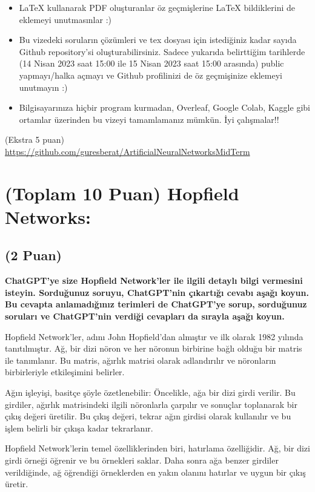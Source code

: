 \documentclass[11pt]{article}
\begin{document}
\begin{itemize}
    \item LaTeX kullanarak PDF oluşturanlar öz geçmişlerine LaTeX bildiklerini de eklemeyi unutmasınlar :)
    \item Bu vizedeki soruların çözümleri ve tex dosyası için istediğiniz kadar sayıda Github repository'si oluşturabilirsiniz. Sadece yukarıda belirttiğim tarihlerde (14 Nisan 2023 saat 15:00 ile 15 Nisan 2023 saat 15:00 arasında) public yapmayı/halka açmayı ve Github profilinizi de öz geçmişinize eklemeyi unutmayın :)
    \item Bilgisayarınıza hiçbir program kurmadan, Overleaf, Google Colab, Kaggle gibi ortamlar üzerinden bu vizeyi tamamlamanız mümkün. İyi çalışmalar!!
\end{itemize}

(Ekstra 5 puan) \url{https://github.com/guresberat/ArtificialNeuralNetworksMidTerm}

\newpage
\section{(Toplam 10 Puan) Hopfield Networks:}

\subsection{(2 Puan)} \textbf{ChatGPT’ye size Hopfield Network’ler ile ilgili detaylı bilgi vermesini isteyin. Sorduğunuz soruyu, ChatGPT'nin çıkartığı cevabı aşağı koyun. Bu cevapta anlamadığınız terimleri de ChatGPT’ye sorup, sorduğunuz soruları ve ChatGPT’nin verdiği cevapları da sırayla aşağı koyun.}

Hopfield Network'ler, adını John Hopfield'dan almıştır ve ilk olarak 1982 yılında tanıtılmıştır. Ağ, bir dizi nöron ve her nöronun birbirine bağlı olduğu bir matris ile tanımlanır. Bu matris, ağırlık matrisi olarak adlandırılır ve nöronların birbirleriyle etkileşimini belirler.

Ağın işleyişi, basitçe şöyle özetlenebilir: Öncelikle, ağa bir dizi girdi verilir. Bu girdiler, ağırlık matrisindeki ilgili nöronlarla çarpılır ve sonuçlar toplanarak bir çıkış değeri üretilir. Bu çıkış değeri, tekrar ağın girdisi olarak kullanılır ve bu işlem belirli bir çıkışa kadar tekrarlanır.

Hopfield Network'lerin temel özelliklerinden biri, hatırlama özelliğidir. Ağ, bir dizi girdi örneği öğrenir ve bu örnekleri saklar. Daha sonra ağa benzer girdiler verildiğinde, ağ öğrendiği örneklerden en yakın olanını hatırlar ve uygun bir çıkış üretir.
\end{document}
